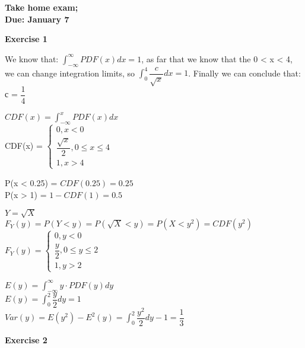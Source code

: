 \documentclass[12pt]{article}
\begin{document}


\begin{center}
\textbf{Take home exam;\\
Due: January 7}
\end{center}

\bigskip
	
\textbf{Exercise 1}		
\begin{list}{()~}{}
\item 
We know that:
$\int_{-\infty}^{\infty} PDF(x) dx = 1$, as far that we know that the 0 < x < 4, we can change integration limits, so $\int_{0}^{4} \dfrac{c}{\sqrt{x}} dx = 1$.
Finally we can conclude that: \\
 с = $\dfrac{1}{4}$
\item
$CDF(x) = \int_{-\infty}^{x} PDF(x) dx$\\
CDF(x) = 
$\begin{cases}
0, x < 0 \\
\dfrac{\sqrt{x}}{2}, 0 \leqslant x \leqslant 4 \\
 1, x > 4
\end{cases}$
\item
P(x < 0.25) = $CDF(0.25) = 0.25$\\
P(x > 1) = $1 - CDF(1) = 0.5$\\
\item
$Y = \sqrt{X}$\\
$F_Y(y) = P(Y < y) = P(\sqrt{X} < y) = P(X < y^2) = CDF(y^2)$\\
$F_Y(y) = 
\begin{cases}
0, y < 0 \\
\dfrac{y}{2}, 0 \leqslant y \leqslant 2 \\
 1, y > 2
\end{cases}$
\item
$E(y) = \int_{-\infty}^{\infty} y \cdot PDF(y) dy$\\
$E(y) = \int_{0}^{2} \dfrac{y}{2} dy = 1$\\
$Var(y) = E(y^2) - E^2(y) = \int_{0}^{2} \dfrac{y^2}{2} dy - 1 = \dfrac{1}{3}$
\end{list}
\medskip

\textbf{Exercise 2}
\end{document}

